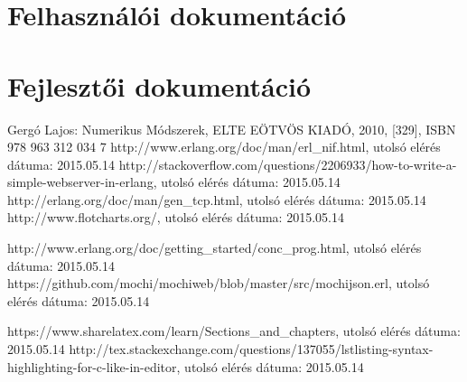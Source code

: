\documentclass{elteikthesis}
\begin{document}
\chapter{Felhasználói dokumentáció}


\chapter{Fejlesztői dokumentáció}



\begin{thebibliography}{9}
Gergó Lajos: Numerikus Módszerek, ELTE EÖTVÖS KIADÓ, 2010, [329], ISBN 978 963 312 034 7
 {http://www.erlang.org/doc/man/erl\_nif.html}, utolsó elérés dátuma: 2015.05.14
 {http://stackoverflow.com/questions/2206933/how-to-write-a-simple-webserver-in-erlang}, utolsó elérés dátuma: 2015.05.14
 {http://erlang.org/doc/man/gen\_tcp.html}, utolsó elérés dátuma: 2015.05.14
 {http://www.flotcharts.org/}, utolsó elérés dátuma: 2015.05.14

 {http://www.erlang.org/doc/getting\_started/conc\_prog.html}, utolsó elérés dátuma: 2015.05.14
 {https://github.com/mochi/mochiweb/blob/master/src/mochijson.erl}, utolsó elérés dátuma: 2015.05.14


\bibitem{} {https://www.sharelatex.com/learn/Sections\_and\_chapters}, utolsó elérés dátuma: 2015.05.14
\bibitem{} {http://tex.stackexchange.com/questions/137055/lstlisting-syntax-highlighting-for-c-like-in-editor}, utolsó elérés dátuma: 2015.05.14


\end{thebibliography}
\end{document}
